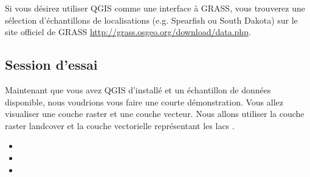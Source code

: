 Si vous d\'esirez utiliser QGIS comme une interface \`a GRASS, vous trouverez une s\'election d'\'echantillons de localisations (e.g. Spearfish ou South Dakota) sur le site officiel de GRASS \url{http://grass.osgeo.org/download/data.php}. 


\subsection{Session d'essai}\label{samplesession}

Maintenant que vous avez QGIS d'install\'e et un \'echantillon de donn\'ees disponible, nous voudrions vous faire une courte d\'emonstration. Vous allez visualiser une couche raster et une couche vecteur. Nous allons utiliser la couche raster landcover  et la couche vectorielle repr\'esentant les lacs .



\begin{itemize} \item {}
\item {}
\item {}
\end{itemize} 

